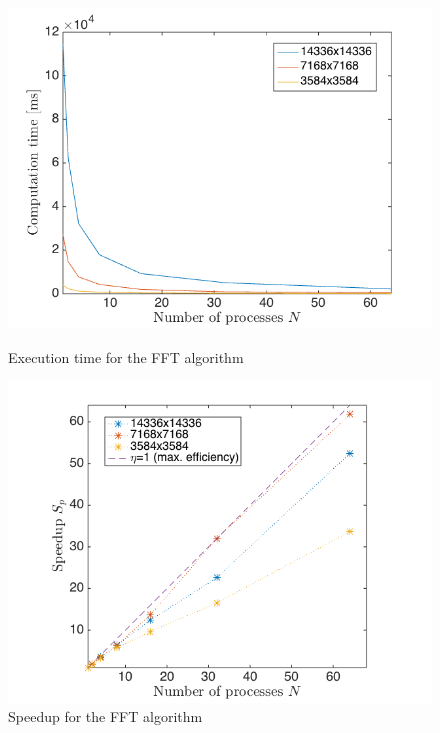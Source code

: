 \begin{figure}[!htb]
    \centering
    \includegraphics[width=\linewidth]{img/fft_benchmarks1.png}
    \caption{Execution time for the FFT algorithm}
    \label{fig:benchmarks_time_fft}
\endminipage\hfill
{}
    \centering
    \includegraphics[width=\linewidth]{img/fft_benchmarks2.png}
    \caption{Speedup for the FFT algorithm}
    \label{fig:benchmarks_speedup_fft}
\endminipage\hfill
\end{figure}


